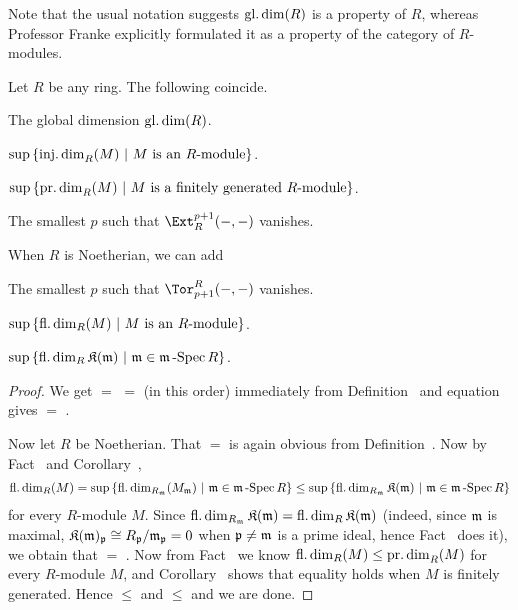 \documentclass[a4paper,parskip=half,numbers=enddot, DIV=12]{scrreprt}
\begin{document}
Note that the usual notation suggests $\operatorname{gl.dim}(R)$ is a property of $R$, whereas Professor Franke explicitly formulated it as a property of the category of $R$-modules.
\begin{cor}
	Let $R$ be any ring. The following coincide.
	\begin{alphanumerate}
		\item The global dimension $\operatorname{gl.dim}(R)$.
		\item $\sup\left\{\operatorname{inj.dim}_R(M)\ \middle|\  M\text{ is an }R\text{-module}\right\}$.
		\item $\sup\left\{\operatorname{pr.dim}_R(M)\ \middle|\  M\text{ is a finitely generated }R\text{-module}\right\}$.
		\item The smallest $p$ such that $\Ext_R^{p+1}(-,-)$ vanishes.
	\end{alphanumerate}
	When $R$ is Noetherian, we can add 
	\begin{alphanumerate}\setcounter{enumi}{4}
		\item The smallest $p$ such that $\Tor_{p+1}^R(-,-)$ vanishes.
		\item $\sup\left\{\operatorname{fl.dim}_R(M)\ \middle|\  M\text{ is an }R\text{-module}\right\}$.
		\item $\sup\left\{\operatorname{fl.dim}_R\mathfrak{K}(\mathfrak{m})\ \middle|\ \mathfrak{m}\in\mathfrak{m}\operatorname{-Spec} R\right\}$.
	\end{alphanumerate}
\end{cor}
\begin{proof}
	We get  $=$  $=$  (in this order) immediately from Definition~ and equation  gives  $=$ .
	
	Now let $R$ be Noetherian. That  $=$  is again obvious from Definition~. Now by Fact~ and Corollary~,
	\begin{align*}
	\operatorname{fl.dim}_R(M)=\sup\left\{\operatorname{fl.dim}_{R_{\mathfrak{m}}}(M_{\mathfrak{m}})\ \middle|\ \mathfrak{m}\in\mathfrak{m}\operatorname{-Spec} R\right\}\leq\sup\left\{\operatorname{fl.dim}_{R_{\mathfrak{m}}}\mathfrak{K}(\mathfrak{m})\ \middle|\ \mathfrak{m}\in\mathfrak{m}\operatorname{-Spec} R\right\}
	\end{align*}
	for every $R$-module $M$. Since $\operatorname{fl.dim}_{R_{\mathfrak{m}}}\mathfrak{K}(\mathfrak{m})=\operatorname{fl.dim}_R\mathfrak{K}(\mathfrak{m})$ (indeed, since $\mathfrak{m}$ is maximal, $\mathfrak{K}(\mathfrak{m})_{\mathfrak{p}}\cong R_{\mathfrak{p}}/\mathfrak{m}_{\mathfrak{p}}=0$ when $\mathfrak{p}\neq\mathfrak{m}$ is a prime ideal, hence Fact~ does it), we obtain that  $=$ . Now from Fact~ we know $\operatorname{fl.dim}_R(M)\leq \operatorname{pr.dim}_R(M)$ for every $R$-module $M$, and Corollary~ shows that equality holds when $M$ is finitely generated. Hence  $\leq$  and  $\leq$  and we are done.
\end{proof}
\end{document}
